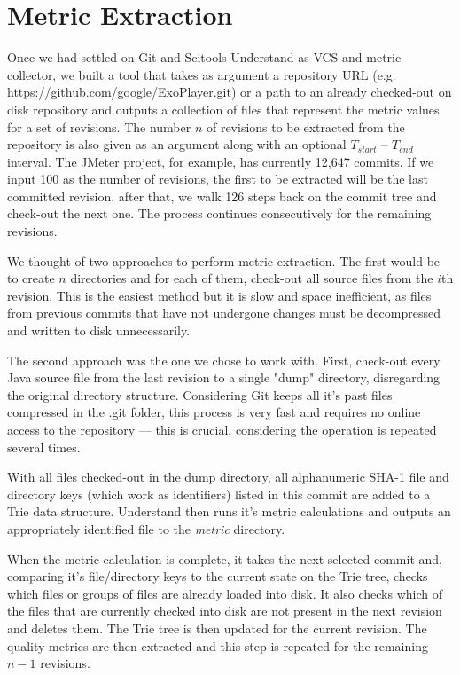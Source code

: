 \section{Metric Extraction} \label{sec:extraction}
Once we had settled on Git and Scitools Understand as VCS and metric collector, we built a tool that takes as argument a repository URL (e.g. \url{https://github.com/google/ExoPlayer.git}) or a path to an already checked-out on disk repository and outputs a collection of files that represent the metric values for a set of revisions. The number $n$ of revisions to be extracted from the repository is also given as an argument along with an optional $T_{start}$ -- $T_{end}$ interval. The JMeter project, for example, has currently 12,647 commits. If we input 100 as the number of revisions, the first to be extracted will be the last committed revision, after that, we walk 126 steps back on the commit tree and check-out the next one. The process continues consecutively for the remaining revisions.

We thought of two approaches to perform metric extraction. The first would be to create $n$ directories and for each of them, check-out all source files from the $i$th revision. This is the easiest method but it is slow and space inefficient, as files from previous commits that have not undergone changes must be decompressed and written to disk unnecessarily.

The second approach was the one we chose to work with. First, check-out every Java source file from the last revision to a single "dump" directory, disregarding the original directory structure. Considering Git keeps all it's past files compressed in the .git folder, this process is very fast and requires no online access to the repository --- this is crucial, considering the operation is repeated several times.

With all files checked-out in the dump directory, all alphanumeric SHA-1 file and directory keys (which work as identifiers) listed in this commit are added to a Trie data structure. Understand then runs it's metric calculations and outputs an appropriately identified file to the \textit{metric} directory.

When the metric calculation is complete, it takes the next selected commit and, comparing it's file/directory keys to the current state on the Trie tree, checks which files or groups of files are already loaded into disk. It also checks which of the files that are currently checked into disk are not present in the next revision and deletes them. The Trie tree is then updated for the current revision. The quality metrics are then extracted and this step is repeated for the remaining $n-1$ revisions.

